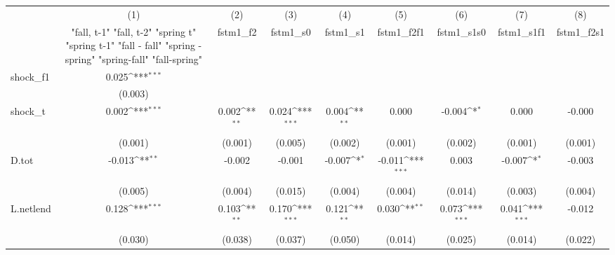 {
\def\sym#1{\ifmmode^{#1}\else\(^{#1}\)\fi}
\begin{tabular}{l*{8}{c}}
\toprule
            &\multicolumn{1}{c}{(1)}&\multicolumn{1}{c}{(2)}&\multicolumn{1}{c}{(3)}&\multicolumn{1}{c}{(4)}&\multicolumn{1}{c}{(5)}&\multicolumn{1}{c}{(6)}&\multicolumn{1}{c}{(7)}&\multicolumn{1}{c}{(8)}\\
            &\multicolumn{1}{c}{  "fall, t-1" "fall, t-2" "spring t" "spring t-1"  "fall - fall" "spring - spring" "spring-fall" "fall-spring" }&\multicolumn{1}{c}{fstm1\_f2}&\multicolumn{1}{c}{fstm1\_s0}&\multicolumn{1}{c}{fstm1\_s1}&\multicolumn{1}{c}{fstm1\_f2f1}&\multicolumn{1}{c}{fstm1\_s1s0}&\multicolumn{1}{c}{fstm1\_s1f1}&\multicolumn{1}{c}{fstm1\_f2s1}\\
\midrule
shock\_f1    &       0.025\sym{***}&                     &                     &                     &                     &                     &                     &                     \\
            &     (0.003)         &                     &                     &                     &                     &                     &                     &                     \\
\addlinespace
shock\_t     &       0.002\sym{***}&       0.002\sym{**} &       0.024\sym{***}&       0.004\sym{**} &       0.000         &      -0.004\sym{*}  &       0.000         &      -0.000         \\
            &     (0.001)         &     (0.001)         &     (0.005)         &     (0.002)         &     (0.001)         &     (0.002)         &     (0.001)         &     (0.001)         \\
\addlinespace
D.tot       &      -0.013\sym{**} &      -0.002         &      -0.001         &      -0.007\sym{*}  &      -0.011\sym{***}&       0.003         &      -0.007\sym{*}  &      -0.003         \\
            &     (0.005)         &     (0.004)         &     (0.015)         &     (0.004)         &     (0.004)         &     (0.014)         &     (0.003)         &     (0.004)         \\
\addlinespace
L.netlend   &       0.128\sym{***}&       0.103\sym{**} &       0.170\sym{***}&       0.121\sym{**} &       0.030\sym{**} &       0.073\sym{***}&       0.041\sym{***}&      -0.012         \\
            &     (0.030)         &     (0.038)         &     (0.037)         &     (0.050)         &     (0.014)         &     (0.025)         &     (0.014)         &     (0.022)         \\

\end{tabular}}

